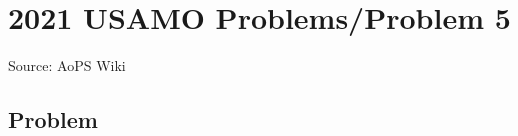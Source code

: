 \documentclass[12pt]{article}
\begin{document}
\section*{{2021 USAMO Problems/Problem 5}}
Source: AoPS Wiki

\subsection*{Problem}
\end{document}
